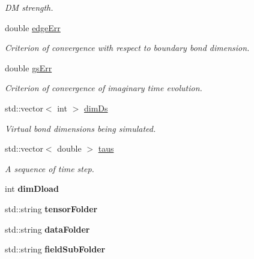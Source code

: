 \begin{DoxyCompactItemize}
\begin{DoxyCompactList}\small\item\em DM strength. \end{DoxyCompactList}\item 
double \hyperlink{structparaPess_ab464bb732582d90c0356626fefd81f9c}{edge\+Err}\hypertarget{structparaPess_ab464bb732582d90c0356626fefd81f9c}{}\label{structparaPess_ab464bb732582d90c0356626fefd81f9c}

\begin{DoxyCompactList}\small\item\em Criterion of convergence with respect to boundary bond dimension. \end{DoxyCompactList}\item 
double \hyperlink{structparaPess_aecfaefcf77fca1251d9d06ad7083a1fa}{gs\+Err}\hypertarget{structparaPess_aecfaefcf77fca1251d9d06ad7083a1fa}{}\label{structparaPess_aecfaefcf77fca1251d9d06ad7083a1fa}

\begin{DoxyCompactList}\small\item\em Criterion of convergence of imaginary time evolution. \end{DoxyCompactList}\item 
std\+::vector$<$ int $>$ \hyperlink{structparaPess_abc0235b9265526a28a9b0c4f46b1f71c}{dim\+Ds}\hypertarget{structparaPess_abc0235b9265526a28a9b0c4f46b1f71c}{}\label{structparaPess_abc0235b9265526a28a9b0c4f46b1f71c}

\begin{DoxyCompactList}\small\item\em Virtual bond dimensions being simulated. \end{DoxyCompactList}\item 
std\+::vector$<$ double $>$ \hyperlink{structparaPess_a8c8dcc3f8d434237e534b3886e8559c0}{taus}\hypertarget{structparaPess_a8c8dcc3f8d434237e534b3886e8559c0}{}\label{structparaPess_a8c8dcc3f8d434237e534b3886e8559c0}

\begin{DoxyCompactList}\small\item\em A sequence of time step. \end{DoxyCompactList}\item 
int {\bfseries dim\+Dload}\hypertarget{structparaPess_a0fac8adc69a920fcbe87ab3cd9593901}{}\label{structparaPess_a0fac8adc69a920fcbe87ab3cd9593901}

\item 
std\+::string {\bfseries tensor\+Folder}\hypertarget{structparaPess_a6ff632cc6adcc69772a08915ddb9afc5}{}\label{structparaPess_a6ff632cc6adcc69772a08915ddb9afc5}

\item 
std\+::string {\bfseries data\+Folder}\hypertarget{structparaPess_a73fe75602d19d89e16e82e8ff3b49aa1}{}\label{structparaPess_a73fe75602d19d89e16e82e8ff3b49aa1}

\item 
std\+::string {\bfseries field\+Sub\+Folder}\hypertarget{structparaPess_ab4f1b22586893569149feca7058177c5}{}\label{structparaPess_ab4f1b22586893569149feca7058177c5}

\end{DoxyCompactItemize}


